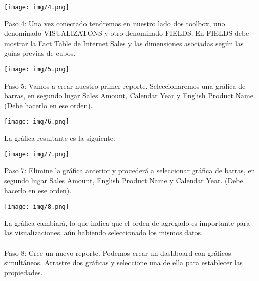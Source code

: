 \documentclass[12pt,letterpaper]{article}
\begin{document}
\begin{center}
    \texttt{[image: img/4.png]}  
\end{center}
Paso 4: Una vez conectado tendremos en nuestro lado dos toolbox, uno denominado VISUALIZATONS y otro denominado FIELDS.
En FIELDS debe mostrar la Fact Table de Internet Sales y las dimensiones asociadas según las guías previas de cubos.

\begin{center}
    \texttt{[image: img/5.png]}  
\end{center}
Paso 5: Vamos a crear nuestro primer reporte. Seleccionaremos una gráfica de barras, en segundo lugar Sales Amount, Calendar Year y English Product Name. (Debe hacerlo en ese orden).
\begin{center}
    \texttt{[image: img/6.png]}  
\end{center}
La gráfica resultante es la siguiente:
\begin{center}
    \texttt{[image: img/7.png]}  
\end{center}
Paso 7: Elimine la gráfica anterior y procederá a seleccionar gráfica de barras, en segundo lugar Sales Amount, English Product Name y Calendar Year. (Debe hacerlo en ese orden).
\begin{center}
    \texttt{[image: img/8.png]}  
\end{center}
La gráfica cambiará, lo que indica que el orden de agregado es importante para las visualizaciones, aún habiendo seleccionado los mismos datos.
\\\\
Paso 8: Cree un nuevo reporte.
Podemos crear un dashboard con gráficos simultáneos. Arrastre dos gráficas y seleccione una de ella para establecer las propiedades.
\end{document}
